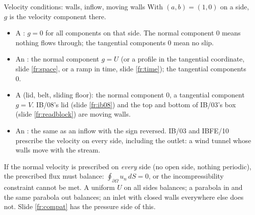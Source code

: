 \documentclass[aspectratio=169,11pt]{beamer}
\begin{document}
\begin{frame}{Velocity conditions: walls, inflow, moving walls}
\label{fr:velocity}
\small With $(a, b) = (1, 0)$ on a side, $g$ is the velocity component there.
\begin{itemize}
  \item A : $g = 0$ for all components on that side. The normal component $0$ means nothing flows through; the tangential components $0$ mean no slip.
  \item An : the normal component $g = U$ (or a profile in the tangential coordinate, slide \ref{fr:space}, or a ramp in time, slide \ref{fr:time}); the tangential components $0$.
  \item A  (lid, belt, sliding floor): the normal component $0$, a tangential component $g = V$. IB/08's lid (slide \ref{fr:ib08}) and the top and bottom of IB/03's box (slide \ref{fr:readblock}) are moving walls.
  \item An : the same as an inflow with the sign reversed. IB/03 and IBFE/10 prescribe the velocity on every side, including the outlet: a wind tunnel whose walls move with the stream.
\end{itemize}
\vspace{1mm}
\begin{punchbox}
\small If the normal velocity is prescribed on \emph{every} side (no open side, nothing periodic), the prescribed flux must balance: $\oint_{\partial\Omega} u_n\,dS = 0$, or the incompressibility constraint cannot be met. A uniform $U$ on all sides balances; a parabola in and the same parabola out balances; an inlet with closed walls everywhere else does not. Slide \ref{fr:compat} has the pressure side of this.
\end{punchbox}
\end{frame}
\end{document}
